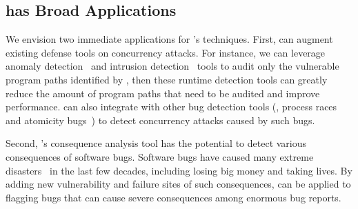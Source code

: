 


\subsection{\xxx has Broad Applications}\label{sec:apps}

We envision two immediate applications for \xxx's techniques. First, \xxx can 
augment existing defense tools on concurrency attacks. For instance, we can 
leverage anomaly detection~\cite{schonberg:pldi89, 
taskrecycling:ppopp90,diduce:icse02} and intrusion 
detection~\cite{hofmeyr:syscall:ids, wagner:syscall:ids, wagner:intrusion} tools 
to audit only the vulnerable program paths identified by \xxx, then these 
runtime detection tools can greatly reduce the amount of program paths that need 
to be audited and improve performance. \xxx can also integrate with other bug 
detection tools (\eg, process races~\cite{racepro:sosp11} and atomicity 
bugs~\cite{ctrigger:asplos09}) to detect concurrency attacks caused by such 
bugs.

Second, \xxx's consequence analysis tool has the potential to detect various 
consequences of software bugs. Software bugs have 
caused many extreme disasters~\cite{10-historical-bug-consequences, 
10-epic-software-bugs} in the last few decades, including losing big money and 
taking lives. By adding new vulnerability and failure sites of such 
consequences, \xxx can be applied to flagging bugs that can cause severe 
consequences among enormous bug reports.

